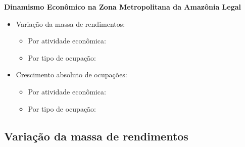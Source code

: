 \documentclass[8pt]{beamer}
\begin{document}
\begin{frame}[label=indice_principal_amz_metropolitana]{}

\textit{\hyperlink{indice_principal}{}}

\textbf{Dinamismo Econômico na Zona Metropolitana da Amazônia Legal}
\vspace{2mm}

\begin{itemize}

\item{Variação da massa de rendimentos:
	\begin{itemize}
	\item{Por atividade econômica: \hyperlink{amzmetropolitanarkngvmassaporcnae2dig}{}}
	\item{Por tipo de ocupação: \hyperlink{amzmetropolitanarkngvmassaporcod2dig}{}}
	\end{itemize}
}
\vspace{1mm}

\item{Crescimento  absoluto de ocupações:
	\begin{itemize}
	\item{Por atividade econômica: \hyperlink{amzmetropolitanarkngnocuporcnae2dig}{}}
	\item{Por tipo de ocupação: \hyperlink{amzmetropolitanarkngnocuporcod2dig}{}}
	\end{itemize}
}
\vspace{1mm}

\end{itemize}

\end{frame}


\subsection{Variação da massa de rendimentos}

\begin{frame}
\textit{\hyperlink{indice_principal_amz_metropolitana}{}}

\end{frame}

\begin{frame}
\textit{\hyperlink{indice_principal_amz_metropolitana}{}}

\end{frame}
\end{document}
